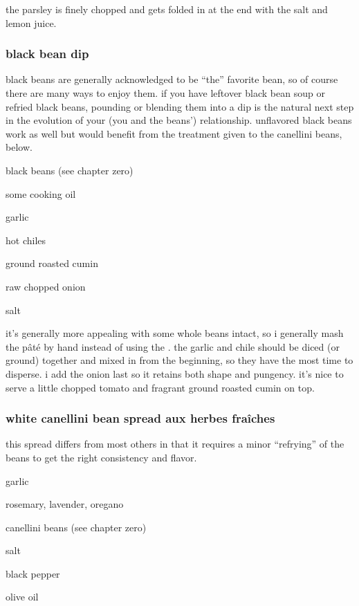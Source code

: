 the parsley is finely chopped and gets folded in at the end with the
salt and lemon juice.

\subsubsection{black bean dip}

black beans are generally acknowledged to be ``the'' favorite
bean, so of course there are many ways to enjoy them. if you have
leftover black bean soup or refried black beans, pounding or blending
them into a dip is the natural next step in the evolution of your (you
and the beans') relationship. unflavored black beans work as well
but would benefit from the treatment given to the canellini beans,
below.

\begin{ingredients}
  \item black beans (see chapter zero)
  \item some cooking oil
  \item garlic
  \item hot chiles
  \item ground roasted cumin
  \item raw chopped onion
  \item salt
\end{ingredients}

it's generally more appealing with some whole beans intact, so i
generally mash the p\^{a}t\'{e} by hand instead of using the . the
garlic and chile should be diced (or ground) together and mixed in
from the beginning, so they have the most time to disperse. i add the
onion last so it retains both shape and pungency. it's nice to
serve a little chopped tomato and fragrant ground roasted cumin on
top.

\subsubsection{white canellini bean spread aux herbes fra\^{i}ches}

this spread differs from most others in that it requires a minor
``refrying'' of the beans to get the right consistency and flavor.

\begin{ingredients}
  \item garlic
  \item rosemary, lavender, oregano
  \item canellini beans (see chapter zero)
  \item salt
  \item black pepper
  \item olive oil
\end{ingredients}

